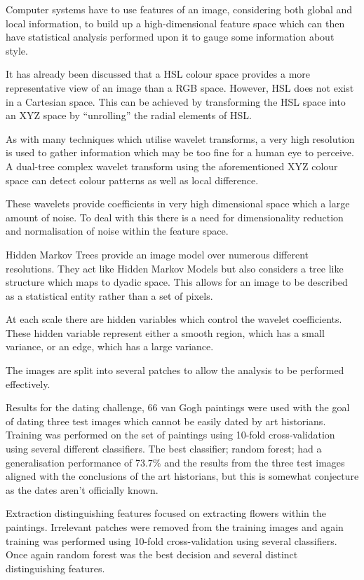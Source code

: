 \documentclass[conference]{IEEEtran}
\begin{document}
Computer systems have to use features of an image, considering both global and
local information, to build up a high-dimensional feature space which can then
have statistical analysis performed upon it to gauge some information about
style.

It has already been discussed that a \gls{HSL} colour space provides a more
representative view of an image than a \gls{RGB} space. However, \gls{HSL} does
not exist in a Cartesian space. This can be achieved by transforming the
\gls{HSL} space into an XYZ space by ``unrolling'' the radial elements of
\gls{HSL}.

As with many techniques which utilise wavelet transforms, a very high
resolution is used to gather information which may be too fine for a human eye
to perceive. A dual-tree complex wavelet transform using the aforementioned XYZ
colour space can detect colour patterns as well as local difference.

These wavelets provide coefficients in very high dimensional space which a
large amount of noise. To deal with this there is a need for dimensionality
reduction and normalisation of noise within the feature space.

Hidden Markov Trees provide an image model over numerous different resolutions.
They act like Hidden Markov Models but also considers a tree like structure
which maps to dyadic space. This allows for an image to be described as a
statistical entity rather than a set of pixels.

At each scale there are hidden variables which control the wavelet
coefficients. These hidden variable represent either a smooth region, which has
a small variance, or an edge, which has a large variance.

The images are split into several patches to allow the analysis to be performed
effectively.

Results for the dating challenge, 66 van Gogh paintings were used with the goal
of dating three test images which cannot be easily dated by art historians.
Training was performed on the set of paintings using 10-fold cross-validation
using several different classifiers. The best classifier; random forest; had a
generalisation performance of 73.7\% and the results from the three test images
aligned with the conclusions of the art historians, but this is somewhat
conjecture as the dates aren't officially known.

Extraction distinguishing features focused on extracting flowers within the
paintings. Irrelevant patches were removed from the training images and again
training was performed using 10-fold cross-validation using several
classifiers. Once again random forest was the best decision and several
distinct distinguishing features.
\end{document}
